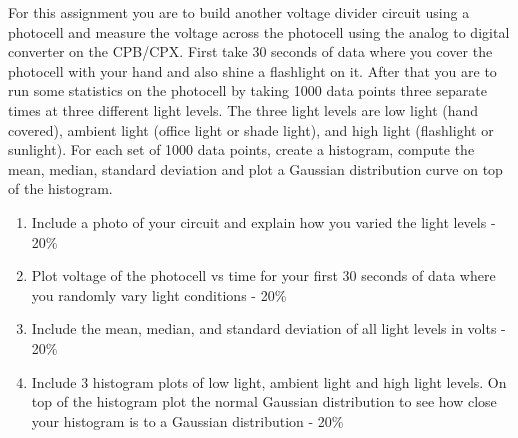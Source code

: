 For this assignment you are to build another voltage divider circuit using a photocell and measure the voltage across the photocell using the analog to digital converter on the CPB/CPX. First take 30 seconds of data where you cover the photocell with your hand and also shine a flashlight on it. After that you are to run some statistics on the photocell by taking 1000 data points three separate times at three different light levels. The three light levels are low light (hand covered), ambient light (office light or shade light), and high light (flashlight or sunlight). For each set of 1000 data points, create a histogram, compute the mean, median, standard deviation and plot a Gaussian distribution curve on top of the histogram. 


        
\begin{enumerate}[itemsep=-5pt]
\item Include a photo of your circuit and explain how you varied the light levels - 20\%
\item Plot voltage of the photocell vs time for your first 30 seconds of data where you randomly vary light conditions - 20\%
\item Include the mean, median, and standard deviation of all light levels in volts - 20\%
\item Include 3 histogram plots of low light, ambient light and high
light levels. On top of the histogram plot the normal Gaussian distribution to see how close your histogram is to a Gaussian distribution - 20\%
\end{enumerate}
